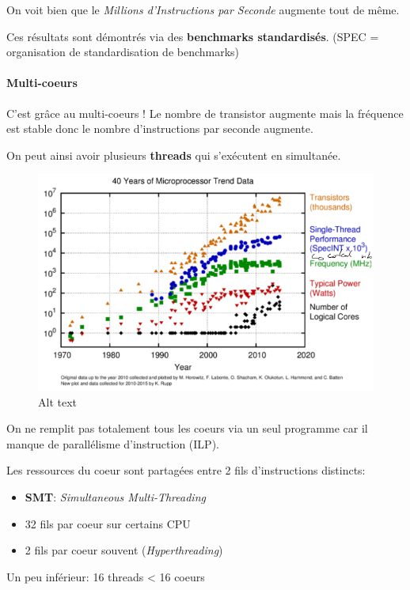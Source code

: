 On voit bien que le \emph{Millions d'Instructions par Seconde} augmente
tout de même.

Ces résultats sont démontrés via des \textbf{benchmarks standardisés}.
(SPEC = organisation de standardisation de benchmarks)

\paragraph{Multi-coeurs}\label{multi-coeurs}

C'est grâce au multi-coeurs ! Le nombre de transistor augmente mais la
fréquence est stable donc le nombre d'instructions par seconde augmente.

On peut ainsi avoir plusieurs \textbf{threads} qui s'exécutent en
simultanée.

\begin{figure}
\centering
\includegraphics{image-23.png}
\caption{Alt text}
\end{figure}

On ne remplit pas totalement tous les coeurs via un seul programme car
il manque de parallélisme d'instruction (ILP).

Les ressources du coeur sont partagées entre 2 fils d'instructions
distincts:

\begin{itemize}
\tightlist
\item
  \textbf{SMT}: \emph{Simultaneous Multi-Threading}
\item
  32 fils par coeur sur certains CPU
\item
  2 fils par coeur souvent (\emph{Hyperthreading})
\end{itemize}

Un peu inférieur: 16 threads \textless{} 16 coeurs

